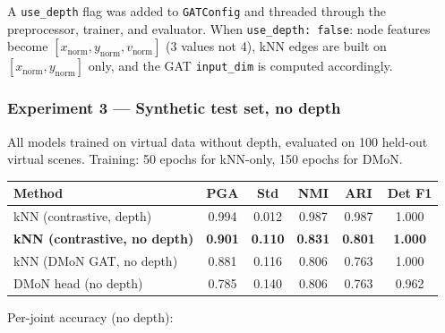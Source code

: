 A \texttt{use\_depth} flag was added to \texttt{GATConfig} and threaded through the preprocessor, trainer, and evaluator. When \texttt{use\_depth: false}: node features become $[x_{\text{norm}}, y_{\text{norm}}, v_{\text{norm}}]$ (3 values not 4), kNN edges are built on $[x_{\text{norm}}, y_{\text{norm}}]$ only, and the GAT \texttt{input\_dim} is computed accordingly.


\subsubsection{Experiment 3 --- Synthetic test set, no depth}

All models trained on virtual data without depth, evaluated on 100 held-out virtual scenes. Training: 50 epochs for kNN-only, 150 epochs for DMoN.

\begin{center}
\begin{tabular}{lccccc}
\toprule
Method & PGA & Std & NMI & ARI & Det F1 \\
\midrule
kNN (contrastive, depth) & 0.994 & 0.012 & 0.987 & 0.987 & 1.000 \\
\textbf{kNN (contrastive, no depth)} & \textbf{0.901} & \textbf{0.110} & \textbf{0.831} & \textbf{0.801} & \textbf{1.000} \\
kNN (DMoN GAT, no depth) & 0.881 & 0.116 & 0.806 & 0.763 & 1.000 \\
DMoN head (no depth) & 0.785 & 0.140 & 0.806 & 0.763 & 0.962 \\
\bottomrule
\end{tabular}
\end{center}

Per-joint accuracy (no depth):

